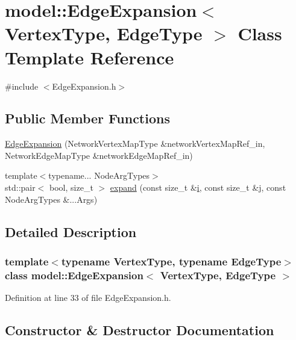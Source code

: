 \hypertarget{classmodel_1_1_edge_expansion}{}\section{model\+:\+:Edge\+Expansion$<$ Vertex\+Type, Edge\+Type $>$ Class Template Reference}
\label{classmodel_1_1_edge_expansion}


{\ttfamily \#include $<$Edge\+Expansion.\+h$>$}

\subsection*{Public Member Functions}
\begin{DoxyCompactItemize}
\item 
\hyperlink{classmodel_1_1_edge_expansion_a8b878e2e718a6a04f010e6ea63b6af4e}{Edge\+Expansion} (Network\+Vertex\+Map\+Type \&network\+Vertex\+Map\+Ref\+\_\+in, Network\+Edge\+Map\+Type \&network\+Edge\+Map\+Ref\+\_\+in)
\item 
{\footnotesize template$<$typename... Node\+Arg\+Types$>$ }\\std\+::pair$<$ bool, size\+\_\+t $>$ \hyperlink{classmodel_1_1_edge_expansion_ad43e2316bf5c1d6b7eaed6ae55ae183d}{expand} (const size\+\_\+t \&\hyperlink{_cubic_spline_intersection_8m_a6f6ccfcf58b31cb6412107d9d5281426}{i}, const size\+\_\+t \&j, const Node\+Arg\+Types \&...Args)
\end{DoxyCompactItemize}


\subsection{Detailed Description}
\subsubsection*{template$<$typename Vertex\+Type, typename Edge\+Type$>$class model\+::\+Edge\+Expansion$<$ Vertex\+Type, Edge\+Type $>$}



Definition at line 33 of file Edge\+Expansion.\+h.



\subsection{Constructor \& Destructor Documentation}
\hypertarget{classmodel_1_1_edge_expansion_a8b878e2e718a6a04f010e6ea63b6af4e}{}
